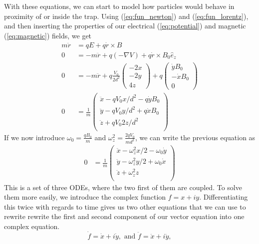With these equations, we can start to model how particles would behave in proximity of or inside the trap. Using (\ref{eq:fun_newton}) and (\ref{eq:fun_lorentz}), and then inserting the properties of our electrical (\ref{eq:potential}) and magnetic (\ref{eq:magnetic}) fields, we get
%
\begin{align*}
m \ddot r &= qE + q\dot r \times B \\
0 &= - m \ddot r + q(- \nabla V) + q\dot r \times B_0 \hat{e}_z \\
0 &= - m \ddot r + q \frac{V_0}{2d^2} \begin{pmatrix} -2x \\ -2y \\ 4z \end{pmatrix}
          + q \begin{pmatrix} \dot y B_0 \\ -\dot x B_0 \\ 0 \end{pmatrix} \\
0 &= \frac{1}{m}
    \begin{pmatrix} 
        \ddot x - q V_0 x / d^2 - q \dot y B_0 \\
        \ddot y - q V_0 y / d^2 + q \dot x B_0 \\
        \ddot z + q V_0 2z / d^2 \\
    \end{pmatrix}
\end{align*}
%
If we now introduce $\omega_0 = \frac{q B_0}{m}$ and $\omega_z^2 = \frac{2qV_0}{md^2}$, we can write the previous equation as
%
\begin{align*}
0 &= \frac{1}{m}
    \begin{pmatrix} 
        \ddot x - \omega_z^2 x / 2 - \omega_0 \dot y \\
        \ddot y - \omega_z^2 y / 2 + \omega_0 \dot x \\
        \ddot z + \omega_z^2 z \\
    \end{pmatrix}
\end{align*}
%
This is a set of three ODEs, where the two first of them are coupled. To solve them more easily, we introduce the complex function $f = x + i y$. Differentiating this twice with regards to time gives us two other equations that we can use to rewrite rewrite the first and second component of our vector equation into one complex equation.
%
\begin{equation*}
\dot f = \dot x + i \dot y, \text{ and } \ddot f = \ddot x + i \ddot y,
\end{equation*}
